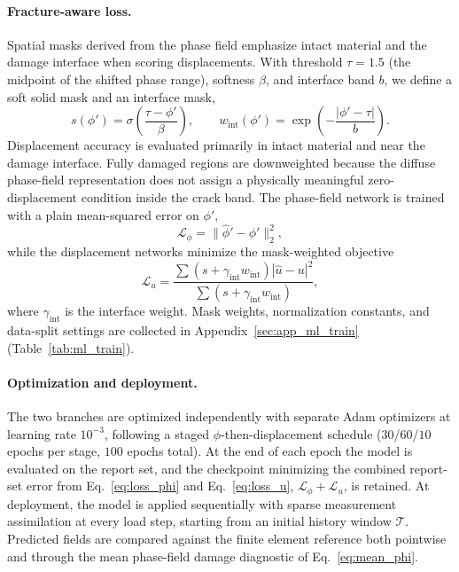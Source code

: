 \documentclass[10pt]{article}
\theoremstyle{definition}
\begin{document}
\paragraph{Fracture-aware loss.}
Spatial masks derived from the phase field emphasize intact material and the damage interface when scoring displacements. With threshold $\tau=1.5$ (the midpoint of the shifted phase range), softness $\beta$, and interface band $b$, we define a soft solid mask and an interface mask,
%
\begin{equation}
    s(\phi') = \sigma\!\left(\frac{\tau-\phi'}{\beta}\right),\qquad
    w_{\mathrm{int}}(\phi') = \exp\!\left(-\frac{|\phi'-\tau|}{b}\right).
    \label{eq:masks}
\end{equation}
%
Displacement accuracy is evaluated primarily in intact material and near the damage interface. Fully damaged regions are downweighted because the diffuse phase-field representation does not assign a physically meaningful zero-displacement condition inside the crack band.
%
The phase-field network is trained with a plain mean-squared error on $\phi'$,
%
\begin{equation}
    \mathcal{L}_\phi = \big\lVert \hat{\phi}' - \phi' \big\rVert_2^2 ,
    \label{eq:loss_phi}
\end{equation}
%
while the displacement networks minimize the mask-weighted objective
%
\begin{equation}
    \mathcal{L}_u
    =
    \frac{\sum (s+\gamma_{\mathrm{int}}w_{\mathrm{int}})
    |\widehat{u}-u|^2}
    {\sum (s+\gamma_{\mathrm{int}}w_{\mathrm{int}})},
    \label{eq:loss_u}
\end{equation}
%
where $\gamma_{\mathrm{int}}$ is the interface weight.
%
Mask weights, normalization constants, and data-split settings are collected in Appendix~\ref{sec:app_ml_train} (Table~\ref{tab:ml_train}).

\paragraph{Optimization and deployment.}
The two branches are optimized independently with separate Adam optimizers at learning rate $10^{-3}$, following a staged $\phi$-then-displacement schedule ($30$/$60$/$10$ epochs per stage, $100$ epochs total).
%
At the end of each epoch the model is evaluated on the report set, and the checkpoint minimizing the combined report-set error from Eq.~\eqref{eq:loss_phi} and Eq.~\eqref{eq:loss_u}, $\mathcal{L}_\phi+\mathcal{L}_u$, is retained.
%
At deployment, the model is applied sequentially with sparse measurement assimilation at every load step, starting from an initial history window $\mathcal{T}$.
%
Predicted fields are compared against the finite element reference both pointwise and through the mean phase-field damage diagnostic of Eq.~\eqref{eq:mean_phi}.
\end{document}
